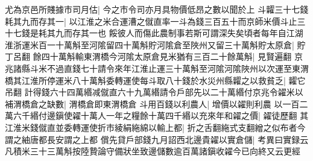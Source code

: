 尤為京邑所賤據市司月估|{
	今之市令司亦月具物價低昂之數以聞於上}
斗糶三十七錢耗其九而存其一|{
	以江淮之米合運漕之僦直率一斗為錢三百五十而京師米價斗止三十七錢是耗其九而存其一也}
餒彼人而傷此農制事若斯可謂深失矣頃者每年自江湖淮浙運米百一十萬斛至河隂留四十萬斛貯河隂倉至陜州又留三十萬斛貯太原倉|{
	貯丁呂翻}
餘四十萬斛輸東渭橋今河隂太原倉見米猶有三百二十餘萬斛|{
	見賢遍翻}
京兆諸縣斗米不過直錢七十請令來年江淮止運三十萬斛至河隂河隂陜州以次運至東渭橋其江淮所停運米八十萬斛委轉運使每斗取八十錢於水災州縣糶之以救貧乏|{
	糶它吊翻}
計得錢六十四萬緡减僦直六十九萬緡請令戶部先以二十萬緡付京兆令糴米以補渭橋倉之缺數|{
	渭橋倉即東渭橋倉}
斗用百錢以利農人|{
	增價以糴則利農}
以一百二萬六千緡付邊鎭使糴十萬人一年之糧餘十萬四千緡以充來年和糴之價|{
	糴徒歷翻}
其江淮米錢僦直並委轉運使折市綾絹絁綿以輸上都|{
	折之舌翻絁式支翻繒之似布者今謂之紬唐都長安謂之上都}
償先貸戶部錢九月詔西北邊貴糴以實倉儲|{
	考異曰實録云凡積米三十三萬斛按陸贄論守備狀坐致邊儲數逾百萬諸鎭收糴今已向終又云更經}


